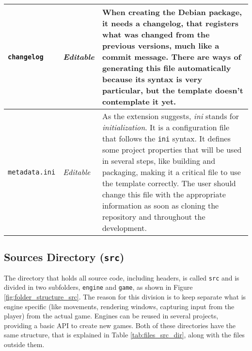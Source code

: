 \begin{longtable}{p{3cm}p{2cm}p{10cm}}
\texttt{changelog} & \emph{Editable} & When creating the Debian package, it needs a changelog, that registers what was changed from the previous versions, much like a commit message. There are ways of generating this file automatically because its syntax is very particular, but the template doesn't contemplate it yet. \\ \hline
\texttt{metadata.ini} & \emph{Editable} & As the extension suggests, \textit{ini} stands for \textit{initialization}. It is a configuration file that follows the \texttt{ini} syntax. It defines some project properties that will be used in several steps, like building and packaging, making it a critical file to use the template correctly. The user should change this file with the appropriate information as soon as cloning the repository and throughout the development. \\

\bottomrule
\end{longtable}


\subsection{Sources Directory (\texttt{src})}
\label{sec:src_folder}

The directory that holds all source code, including headers, is called \texttt{src} and is divided in two subfolders, \texttt{engine} and \texttt{game}, as shown in Figure \ref{fig:folder_structure_src}. The reason for this division is to keep separate what is engine specific (like movements, rendering windows, capturing input from the player) from the actual game. Engines can be reused in several projects, providing a basic API to create new games. Both of these directories have the same structure, that is explained in Table \ref{tab:files_src_dir}, along with the files outside them.

